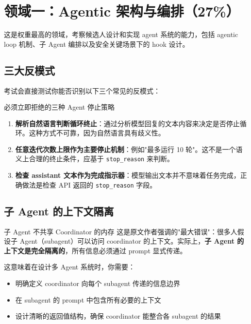 \section{领域一：Agentic 架构与编排（27\%）}

这是权重最高的领域，考察候选人设计和实现 agent 系统的能力，包括 agentic loop 机制、子 Agent 编排以及安全关键场景下的 hook 设计。

\subsection{三大反模式}

考试会直接测试你能否识别以下三个常见的反模式：

\begin{warningbox}{必须立即拒绝的三种 Agent 停止策略}
\begin{enumerate}[leftmargin=1.5em]
    \item \textbf{解析自然语言判断循环终止}：通过分析模型回复的文本内容来决定是否停止循环。这种方式不可靠，因为自然语言具有歧义性。
    \item \textbf{任意迭代次数上限作为主要停止机制}：例如"最多运行 10 轮"。这不是一个语义上合理的终止条件，应基于 \texttt{stop\_reason} 来判断。
    \item \textbf{检查 assistant 文本作为完成指示器}：模型输出文本并不意味着任务完成，正确做法是检查 API 返回的 \texttt{stop\_reason} 字段。
\end{enumerate}
\end{warningbox}

\subsection{子 Agent 的上下文隔离}

\begin{importantbox}{子 Agent 不共享 Coordinator 的内存}
这是原文作者强调的"最大错误"：很多人假设子 Agent（subagent）可以访问 coordinator 的上下文。实际上，\textbf{子 Agent 的上下文是完全隔离的}，所有信息必须通过 prompt 显式传递。
\end{importantbox}

这意味着在设计多 Agent 系统时，你需要：
\begin{itemize}[leftmargin=1.5em]
    \item 明确定义 coordinator 向每个 subagent 传递的信息边界
    \item 在 subagent 的 prompt 中包含所有必要的上下文
    \item 设计清晰的返回值结构，确保 coordinator 能整合各 subagent 的结果
\end{itemize}

